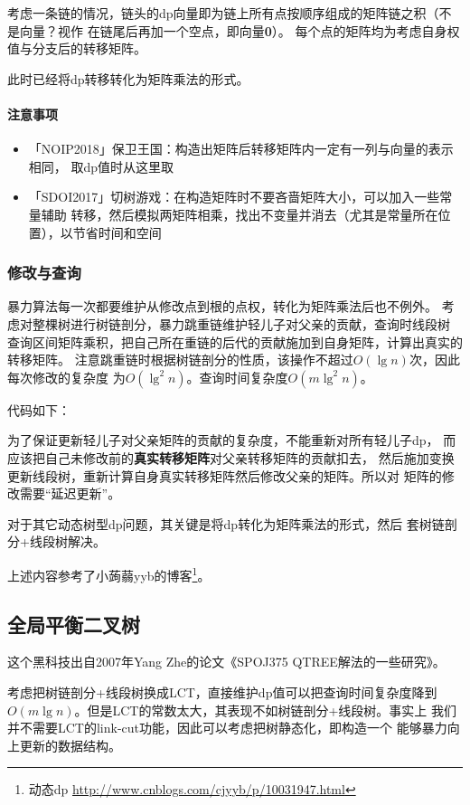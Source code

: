 考虑一条链的情况，链头的dp向量即为链上所有点按顺序组成的矩阵链之积（不是向量？视作
在链尾后再加一个空点，即向量{\bfseries 0}）。
每个点的矩阵均为考虑自身权值与分支后的转移矩阵。

此时已经将dp转移转化为矩阵乘法的形式。

\paragraph{注意事项}
\begin{itemize}
    \item 「NOIP2018」保卫王国：构造出矩阵后转移矩阵内一定有一列与向量的表示相同，
    取dp值时从这里取
    \item 「SDOI2017」切树游戏：在构造矩阵时不要吝啬矩阵大小，可以加入一些常量辅助
    转移，然后模拟两矩阵相乘，找出不变量并消去（尤其是常量所在位置），以节省时间和空间
\end{itemize}

\subsubsection{修改与查询}
暴力算法每一次都要维护从修改点到根的点权，转化为矩阵乘法后也不例外。
考虑对整棵树进行树链剖分，暴力跳重链维护轻儿子对父亲的贡献，查询时线段树
查询区间矩阵乘积，把自己所在重链的后代的贡献施加到自身矩阵，计算出真实的转移矩阵。
注意跳重链时根据树链剖分的性质，该操作不超过$O(\lg n)$次，因此每次修改的复杂度
为$O(\lg^2 n)$。查询时间复杂度$O(m\lg^2n)$。

代码如下：


为了保证更新轻儿子对父亲矩阵的贡献的复杂度，不能重新对所有轻儿子dp，
而应该把自己未修改前的{\bfseries 真实转移矩阵}对父亲转移矩阵的贡献扣去，
然后施加变换更新线段树，重新计算自身真实转移矩阵然后修改父亲的矩阵。所以对
矩阵的修改需要``延迟更新''。

对于其它动态树型dp问题，其关键是将dp转化为矩阵乘法的形式，然后
套树链剖分+线段树解决。

上述内容参考了小蒟蒻yyb的博客\footnote{
    动态dp
    \url{http://www.cnblogs.com/cjyyb/p/10031947.html}
}。
\subsection{全局平衡二叉树}
这个黑科技出自2007年Yang Zhe的论文《SPOJ375 QTREE解法的一些研究》\cite{GBT}。

考虑把树链剖分+线段树换成LCT，直接维护dp值可以把查询时间复杂度降到
$O(m\lg n)$。但是LCT的常数太大，其表现不如树链剖分+线段树。事实上
我们并不需要LCT的link-cut功能，因此可以考虑把树静态化，即构造一个
能够暴力向上更新的数据结构。

